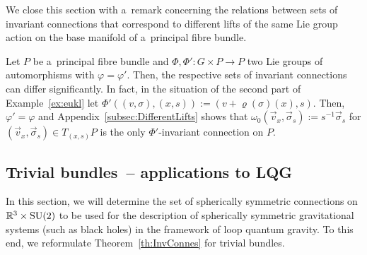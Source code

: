 \documentclass[pdftex]{sigma}
\numberwithin{equation}{section}
\begin{document}
We close this section with a~remark concerning the relations between sets of invariant connections that
correspond to dif\/ferent lifts of the same Lie group action on the base manifold of a~principal f\/ibre bundle.
\begin{Remark}
Let $P$ be a~principal f\/ibre bundle and $\Phi,\Phi'\colon G\times P\rightarrow P$ two Lie groups of automorphisms
with $\varphi=\varphi'$.
Then, the respective sets of invariant connections can dif\/fer signif\/icantly.
In fact, in the situation of the second part of Example~\ref{ex:eukl} let $\Phi'((v,\sigma),(x,s)):=(v+
\varrho(\sigma)(x),s)$.
Then, $\varphi'=\varphi$ and Appendix~\ref{subsec:DifferentLifts} shows that
$\omega_0(\vec{v}_x,\vec{\sigma}_s):=s^{-1}\vec{\sigma}_s$ for $(\vec{v}_x,\vec{\sigma}_s)\in T_{(x,s)}P$ is the only
$\Phi'$-invariant connection on $P$.
\end{Remark}

\subsection{Trivial bundles~-- applications to LQG}\label{sec:ApplTrivB}

In this section, we will determine the set of spherically symmetric connections on $\mathbb{R}^3\times {\rm SU}(2)$ to be used for the
description of spherically symmetric gravitational systems (such as black holes) in the framework of loop quantum gravity.
To this end, we reformulate Theorem~\ref{th:InvConnes} for trivial bundles.
\end{document}
